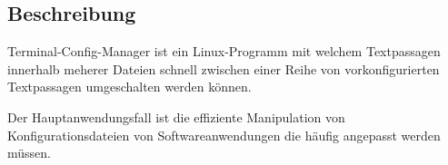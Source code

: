 \subsection{Beschreibung} \label{Beschreibung}
Terminal-Config-Manager ist ein Linux-Programm mit welchem
\gls{Textpassage}n innerhalb meherer Dateien schnell zwischen einer Reihe
von vorkonfigurierten \gls{Textpassage}n umgeschalten werden können.

Der Hauptanwendungsfall ist die effiziente  Manipulation von
Konfigurationsdateien von Softwareanwendungen die häufig angepasst
werden müssen.
